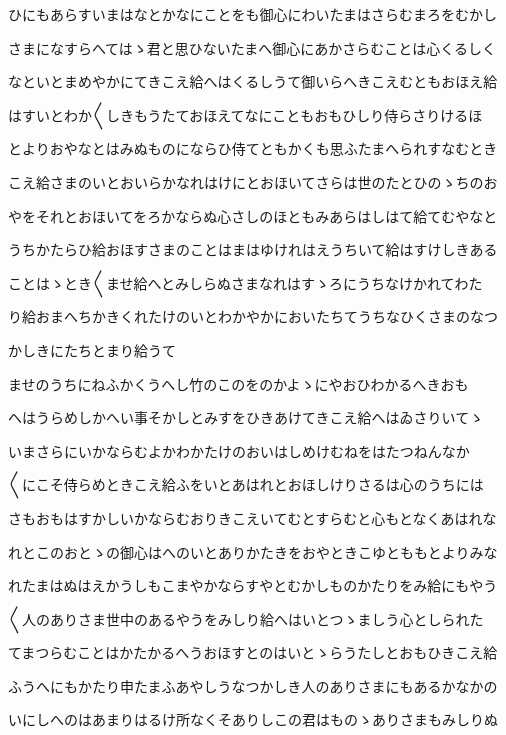 \documentclass[a4paper,11pt,landscape]{ltjtarticle}
\begin{document}
\par\medskip
ひにもあらすいまはなとかなにことをも御心にわいたまはさらむまろをむかし
\par\medskip
さまになすらへてはゝ君と思ひないたまへ御心にあかさらむことは心くるしく
\par\medskip
なといとまめやかにてきこえ給へはくるしうて御いらへきこえむともおほえ給
\par\medskip
はすいとわか〱しきもうたておほえてなにこともおもひしり侍らさりけるほ
\par\medskip
とよりおやなとはみぬものにならひ侍てともかくも思ふたまへられすなむとき
\par\medskip
こえ給さまのいとおいらかなれはけにとおほいてさらは世のたとひのゝちのお
\par\medskip
やをそれとおほいてをろかならぬ心さしのほともみあらはしはて給てむやなと
\par\medskip
うちかたらひ給おほすさまのことはまはゆけれはえうちいて給はすけしきある
\par\medskip
ことはゝとき〱ませ給へとみしらぬさまなれはすゝろにうちなけかれてわた
\par\medskip
り給おまへちかきくれたけのいとわかやかにおいたちてうちなひくさまのなつ
\par\medskip
かしきにたちとまり給うて
\par\medskip
ませのうちにねふかくうへし竹のこのをのかよゝにやおひわかるへきおも
\par\medskip
へはうらめしかへい事そかしとみすをひきあけてきこえ給へはゐさりいてゝ
\par\medskip
いまさらにいかならむよかわかたけのおいはしめけむねをはたつねんなか
\par\medskip
〱にこそ侍らめときこえ給ふをいとあはれとおほしけりさるは心のうちには
\par\medskip
さもおもはすかしいかならむおりきこえいてむとすらむと心もとなくあはれな
\par\medskip
れとこのおとゝの御心はへのいとありかたきをおやときこゆとももとよりみな
\par\medskip
れたまはぬはえかうしもこまやかならすやとむかしものかたりをみ給にもやう
\par\medskip
〱人のありさま世中のあるやうをみしり給へはいとつゝましう心としられた
\par\medskip
てまつらむことはかたかるへうおほすとのはいとゝらうたしとおもひきこえ給
\par\medskip
ふうへにもかたり申たまふあやしうなつかしき人のありさまにもあるかなかの
\par\medskip
いにしへのはあまりはるけ所なくそありしこの君はものゝありさまもみしりぬ
\end{document}
